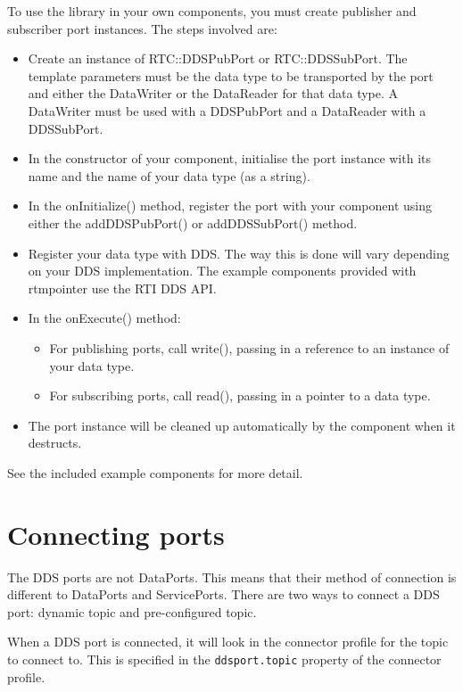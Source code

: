 \documentclass[a4paper,10pt]{article}
\newcommand{\ilcode}[1]{\lstinline|#1|}
\begin{document}
To use the library in your own components, you must create publisher and
subscriber port instances. The steps involved are:

\begin{itemize}
  \item Create an instance of RTC::DDSPubPort or RTC::DDSSubPort. The
  template parameters must be the data type to be transported by the
  port and either the DataWriter or the DataReader for that data type. A
  DataWriter must be used with a DDSPubPort and a DataReader with a
  DDSSubPort.
  \item In the constructor of your component, initialise the port
  instance with its name and the name of your data type (as a string).
  \item In the onInitialize() method, register the port with your
  component using either the addDDSPubPort() or addDDSSubPort() method.
  \item Register your data type with DDS. The way this is done will vary
  depending on your DDS implementation. The example components provided
  with rtmpointer use the RTI DDS API.
  \item In the onExecute() method:
  \begin{itemize}
    \item For publishing ports, call write(), passing in a reference to
    an instance of your data type.
    \item For subscribing ports, call read(), passing in a pointer to a
    data type.
  \end{itemize}
  \item The port instance will be cleaned up automatically by the
  component when it destructs.
\end{itemize}

See the included example components for more detail.

\section{Connecting ports}
\label{sec:connecting}

The DDS ports are not DataPorts. This means that their method of
connection is different to DataPorts and ServicePorts. There are two
ways to connect a DDS port: dynamic topic and pre-configured topic.

When a DDS port is connected, it will look in the connector profile for
the topic to connect to. This is specified in the \ilcode{ddsport.topic}
property of the connector profile.
\end{document}
